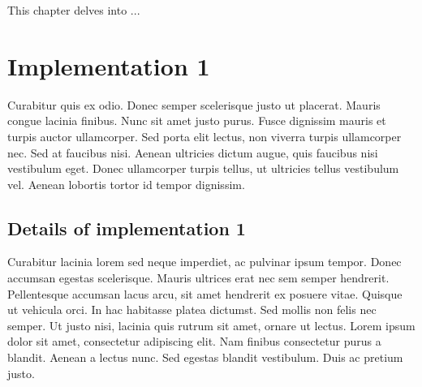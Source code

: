 This chapter delves into ...


\section{Implementation 1}
Curabitur quis ex odio. Donec semper scelerisque justo ut placerat. Mauris congue lacinia finibus. Nunc sit amet justo purus. Fusce dignissim mauris et turpis auctor ullamcorper. Sed porta elit lectus, non viverra turpis ullamcorper nec. Sed at faucibus nisi. Aenean ultricies dictum augue, quis faucibus nisi vestibulum eget. Donec ullamcorper turpis tellus, ut ultricies tellus vestibulum vel. Aenean lobortis tortor id tempor dignissim.

\subsection{Details of implementation 1}
Curabitur lacinia lorem sed neque imperdiet, ac pulvinar ipsum tempor. Donec accumsan egestas scelerisque. Mauris ultrices erat nec sem semper hendrerit. Pellentesque accumsan lacus arcu, sit amet hendrerit ex posuere vitae. Quisque ut vehicula orci. In hac habitasse platea dictumst. Sed mollis non felis nec semper. Ut justo nisi, lacinia quis rutrum sit amet, ornare ut lectus. Lorem ipsum dolor sit amet, consectetur adipiscing elit. Nam finibus consectetur purus a blandit. Aenean a lectus nunc. Sed egestas blandit vestibulum. Duis ac pretium justo.